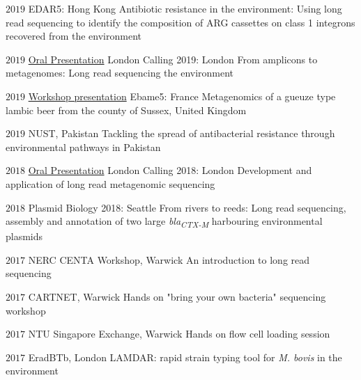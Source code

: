 \documentclass[hidelinks]{james-cv} %
\begin{document}
\hspace{-19\parskip}\begin{sentrylist}

\entr
{$2019$}
{}
{EDAR5: Hong Kong}
{Antibiotic resistance in the environment: Using long read sequencing to identify the composition of ARG cassettes on class 1 integrons recovered from the environment}

\entr
{$2019$}
{\bodyfontsc\color{blue}\href{https://www.youtube.com/watch?v=9ObT2ACDnfw}{Oral Presentation}}
{London Calling 2019: London}
{From amplicons to metagenomes: Long read sequencing the environment}

\entr
{$2019$}
{\bodyfontsc\color{blue}\href{https://github.com/BadgerRob/Ebame5/blob/master/Coolship_firle_microflora_workshop.md}{Workshop presentation}}
{Ebame5: France}
{Metagenomics of a gueuze type lambic beer from the county of Sussex, United Kingdom}

\entr
{$2019$}
{}
{NUST, Pakistan}
{Tackling  the spread of antibacterial resistance through environmental pathways in Pakistan}

\entr
{$2018$}
{\bodyfontsc\color{blue}\href{https://vimeo.com/272728056}{Oral Presentation}}
{London Calling 2018: London}
{Development and application of long read metagenomic sequencing}

\entr
{$2018$}
{}
{Plasmid Biology 2018: Seattle}
{From rivers to reeds: Long read sequencing, assembly and annotation of two large \textit{bla}\textit{\textsubscript{CTX-M}} harbouring environmental plasmids}

\entr
{$2017$}
{}
{NERC CENTA Workshop, Warwick}
{An introduction to long read sequencing}

\entr
{$2017$}
{}
{CARTNET, Warwick}
{Hands on "bring your own bacteria" sequencing workshop}

\entr
{$2017$}
{}
{NTU Singapore Exchange, Warwick}
{Hands on flow cell loading session}

\entr
{$2017$}
{}
{EradBTb, London}
{LAMDAR: rapid strain typing tool for \textit {M. bovis} in the environment}

\end{sentrylist}

\end{document}
